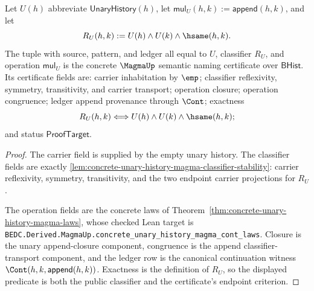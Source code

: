 \begin{theorem}
\label{thm:concrete-unary-history-magma-semantic-certificate}
Let $U(h)$ abbreviate $\mathsf{UnaryHistory}(h)$, let
$\mathsf{mul}_U(h,k):=\mathsf{append}(h,k)$, and let
$$
R_U(h,k):=U(h)\land U(k)\land\hsame(h,k).
$$
The tuple with source, pattern, and ledger all equal to $U$, classifier
$R_U$, and operation $\mathsf{mul}_U$ is the concrete $\MagmaUp$ semantic
naming certificate over $\mathsf{BHist}$. Its certificate fields are: carrier
inhabitation by $\emp$; classifier reflexivity, symmetry, transitivity, and
carrier transport; operation closure; operation congruence; ledger append
provenance through $\Cont$; exactness
$$
R_U(h,k)\Longleftrightarrow U(h)\land U(k)\land\hsame(h,k);
$$
and status $\mathsf{ProofTarget}$.
\end{theorem}
\begin{proof}
The carrier field is supplied by the empty unary history. The classifier
fields are exactly
\autoref{lem:concrete-unary-history-magma-classifier-stability}: carrier
reflexivity, symmetry, transitivity, and the two endpoint carrier projections
for $R_U$.

The operation fields are the concrete laws of
Theorem~\ref{thm:concrete-unary-history-magma-laws}, whose checked Lean target
is
\texttt{BEDC.Derived.MagmaUp.concrete\_unary\_history\_magma\_cont\_laws}.
Closure is the unary append-closure component, congruence is the append
classifier-transport component, and the ledger row is the canonical
continuation witness $\Cont(h,k,\mathsf{append}(h,k))$. Exactness is the
definition of $R_U$, so the displayed predicate is both the public classifier
and the certificate's endpoint criterion.
\end{proof}

